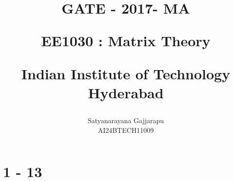 \documentclass[journal]{IEEEtran}
\begin{document}

\vspace{3cm}




\title{
GATE - 2017- MA

\large{EE1030 : Matrix Theory}

Indian Institute of Technology Hyderabad
}
\author{Satyanarayana Gajjarapu

AI24BTECH11009
}	





\maketitle




\bigskip

\renewcommand{\thefigure}{\theenumi}
\renewcommand{\thetable}{\theenumi}


\section{1 - 13}
\end{document}
